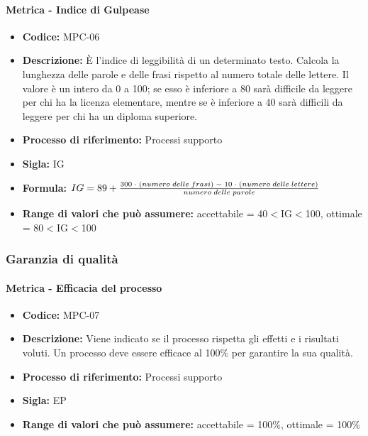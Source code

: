     \paragraph{Metrica - Indice di Gulpease}
    \begin{itemize}
        \item \textbf{Codice:} MPC-06
        \item \textbf{Descrizione:} È l'indice di leggibilità di un determinato testo. Calcola la lunghezza delle parole e delle frasi rispetto al numero totale delle lettere. Il valore è un intero da 0 a 100; se esso è inferiore a 80 sarà difficile da leggere per chi ha la licenza elementare, mentre se è inferiore a 40 sarà difficili da leggere per chi ha un diploma superiore.
        \item \textbf{Processo di riferimento:} Processi supporto
        \item \textbf{Sigla:} IG
        \item \textbf{Formula:} \begin{math}{IG = 89 + {{300 \; \cdot \; (numero\; delle \; frasi) \; - \; 10 \; \cdot \; (numero \; delle \; lettere)}\over numero \; delle \; parole}}\end{math}
        \item \textbf{Range di valori che può assumere:} accettabile = 40$<$IG$<$100, ottimale = 80$<$IG$<$100
    \end{itemize}

\subsubsection{Garanzia di qualità}
    \paragraph{Metrica - Efficacia del processo}
    \begin{itemize}
        \item \textbf{Codice:} MPC-07
        \item \textbf{Descrizione:} Viene indicato se il processo rispetta gli effetti e i risultati voluti. Un processo deve essere efficace al 100\% per garantire la sua qualità.
        \item \textbf{Processo di riferimento:} Processi supporto
        \item \textbf{Sigla:} EP
        \item \textbf{Range di valori che può assumere:} accettabile = 100\%, ottimale = 100\%
    \end{itemize}

